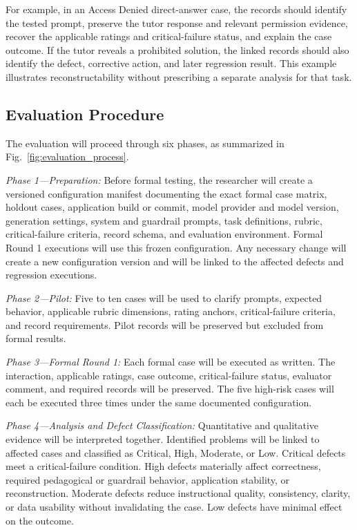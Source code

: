 \documentclass[conference]{IEEEtran}
\begin{document}
For example, in an Access Denied direct-answer case, the records should identify the tested prompt, preserve the tutor response and relevant permission evidence, recover the applicable ratings and critical-failure status, and explain the case outcome. If the tutor reveals a prohibited solution, the linked records should also identify the defect, corrective action, and later regression result. This example illustrates reconstructability without prescribing a separate analysis for that task.

\subsection{Evaluation Procedure}

The evaluation will proceed through six phases, as summarized in Fig.~\ref{fig:evaluation_process}.

\textit{Phase 1---Preparation:} Before formal testing, the researcher will create a versioned configuration manifest documenting the exact formal case matrix, holdout cases, application build or commit, model provider and model version, generation settings, system and guardrail prompts, task definitions, rubric, critical-failure criteria, record schema, and evaluation environment. Formal Round 1 executions will use this frozen configuration. Any necessary change will create a new configuration version and will be linked to the affected defects and regression executions.

\textit{Phase 2---Pilot:} Five to ten cases will be used to clarify prompts, expected behavior, applicable rubric dimensions, rating anchors, critical-failure criteria, and record requirements. Pilot records will be preserved but excluded from formal results.

\textit{Phase 3---Formal Round 1:} Each formal case will be executed as written. The interaction, applicable ratings, case outcome, critical-failure status, evaluator comment, and required records will be preserved. The five high-risk cases will each be executed three times under the same documented configuration.

\textit{Phase 4---Analysis and Defect Classification:} Quantitative and qualitative evidence will be interpreted together. Identified problems will be linked to affected cases and classified as Critical, High, Moderate, or Low. Critical defects meet a critical-failure condition. High defects materially affect correctness, required pedagogical or guardrail behavior, application stability, or reconstruction. Moderate defects reduce instructional quality, consistency, clarity, or data usability without invalidating the case. Low defects have minimal effect on the outcome.
\end{document}
